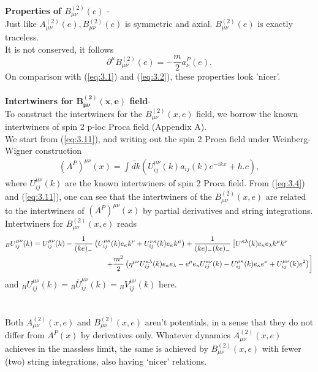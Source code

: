 \documentclass[12pt,a4paper]{article}
\numberwithin{equation}{section}
\begin{document}
\textbf{\textcolor{blue!50!black}{Properties of $B_{\mu \nu}^{(2)}(e)$}} - \\
Just like $A_{\mu \nu}^{(2)}(e), B_{\mu \nu}^{(2)}(e)$ is symmetric and axial. $B_{\mu \nu}^{(2)}(e)$ is exactly traceless. \\
It is not conserved, it follows
$$
\partial^{\mu} B_{\mu \nu}^{(2)}(e)=-\frac{m}{2} a^P_{\nu}(e).
$$
On comparison with (\ref{eq:3.1}) and (\ref{eq:3.2}), these properties look 'nicer'.  \\\\
\textbf{\textcolor{blue!50!black}{Intertwiners for $\boldsymbol{B^{(2)}_{\mu\nu}(x,e)}$ field}}-\\
To construct the intertwiners for the $B^{(2)}_{\mu\nu}(x,e)$ field, we borrow the known intertwiners of spin 2 p-loc Proca field (Appendix A).\\
We start from (\ref{eq:3.11}), and writing out the spin 2 Proca field under Weinberg-Wigner construction 
\begin{align}
(A^P)^{\mu\nu}(x)=\int \widetilde{dk}\left(U^{\mu\nu}_{ij}(k)a_{ij}(k)e^{-ikx}+h.c\right),    
\end{align}
where $U^{\mu\nu}_{ij}(k)$ are the known intertwiners of spin 2 Proca field. From (\ref{eq:3.4}) and (\ref{eq:3.11}), one can see that the intertwiners of the $B^{(2)}_{\mu\nu}(x,e)$ are related to the intertwiners of $(A^P)^{\mu\nu}(x)$ by partial derivatives and string integrations. \\
Intertwiners for $B^{(2)}_{\mu\nu}(x,e)$ reads 
\begin{align}
{}_{B}U^{\mu\nu}_{ij}(k)&=U^{\mu\nu}_{ij}(k)-\frac{1}{(ke)_-}\left(U^{\mu\kappa}_{ij}(k)e_\kappa k^\nu+U^{\nu\kappa}_{ij}(k)e_\kappa k^\mu\right)+\frac{1}{(ke)_-(ke)_-}\left[U^{\kappa\lambda}(k)e_\kappa e_\lambda k^\mu k^\nu\right.\notag\\&\left.\hspace{100pt}+\frac{m^2}{2}\left(\eta^{\mu\nu} U_{ij}^{\kappa\lambda}(k)e_\kappa e_\lambda-e^\mu e_\kappa U_{ij}^{\kappa\nu}(k)-U^{\mu\kappa}_{ij}(k)e_\kappa e^\nu+U^{\mu\nu}_{ij}(k)e^2\right)\right]
\end{align}
and 
${}_{B}U^{\mu\nu}_{ij}(k)={}_{B}\overline{U}^{\mu\nu}_{ij}(k)={}_{B}V^{\mu\nu}_{ij}(k)$ here.  \\
\\\\
Both $A^{(2)}_{\mu\nu}(x,e)$ and $B^{(2)}_{\mu\nu}(x,e)$ aren't potentials, in a sense that they do not differ from $A^P(x)$ by derivatives only. Whatever dynamics $A^{(2)}_{\mu\nu}(x,e)$ achieves in the massless limit, the same is achieved by $B^{(2)}_{\mu\nu}(x,e)$ with fewer (two) string integrations, also having `nicer' relations.  
\end{document}
